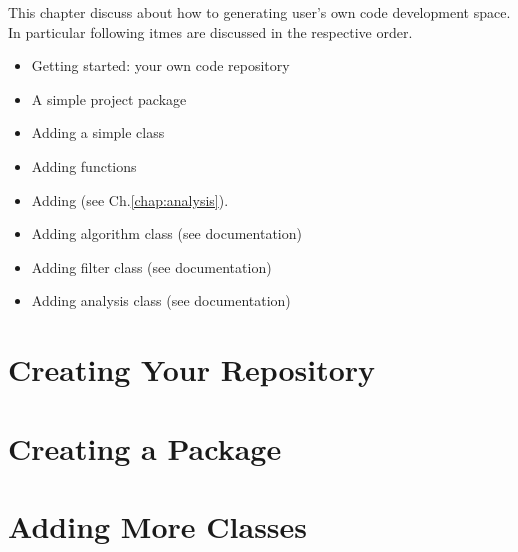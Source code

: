 
This chapter discuss about how to generating user's own code development space.
In particular following itmes are discussed in the respective order.
\begin{itemize}
\item Getting started: your own code repository
\item A simple \CPP project package 
\item Adding a simple \CPP class
\item Adding \CPP functions
\item Adding \anaunit (see Ch.\ref{chap:analysis}).
\item Adding \ertool algorithm class (see \ertool documentation)
\item Adding \ertool filter class (see \ertool documentation)
\item Adding \ertool analysis class (see \ertool documentation)
\end{itemize}

\section{Creating Your Repository}
\label{sec:devrepo}


\section{Creating a Package}
\label{sec:package}


\section{Adding More \CPP Classes}
\label{sec:expand_package}

